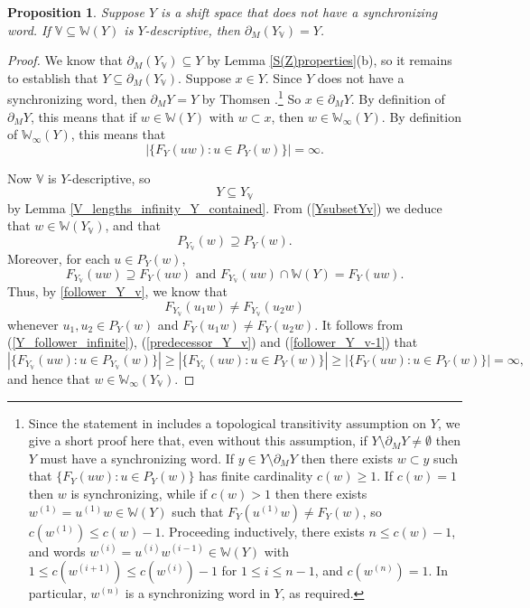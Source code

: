 \documentclass[reqno,11pt]{amsart}
\newtheorem{prop}[thm]{Proposition}
\theoremstyle{definition}
\theoremstyle{remark}
\theoremstyle{remark}
\def\w{\mathbb{W}}
\def\v{\mathbb V}
\numberwithin{equation}{section}
\begin{document}
\begin{prop}\label{partial_Y_v_equals_Y}
Suppose $Y$ is a shift space that  does not have a synchronizing word.
 If $\v\subseteq\w(Y)$
is $Y$-descriptive,
then $\partial_M( Y_\v ) = Y$.
\end{prop}
\begin{proof}
We know that $\partial_M( Y_\v )\subseteq Y$ by Lemma \ref{S(Z)properties}(b), so it remains to establish that
$Y\subseteq \partial_M( Y_\v )$.
Suppose $x\in Y$.
Since $Y$ does not have a synchronizing word, then $\partial_M Y=Y$ by Thomsen 
\cite[Thm.~3.1]{Tho06}.\footnote{Since the statement in \cite[Thm.~3.1]{Tho06} includes a 
topological transitivity assumption on $Y$,
we give a short proof here that, even without this assumption, if $Y\setminus \partial_M Y\neq\emptyset$ then $Y$ must have a synchronizing word. If $y\in Y\setminus \partial_M Y$ then there exists $w\subset y$ such that
$\{F_Y(uw):u\in P_Y(w)\}$ has finite cardinality $c(w)\ge 1$. If $c(w)=1$ then $w$ is synchronizing,
while if $c(w)>1$ then there exists $w^{(1)}=u^{(1)}w\in\w(Y)$ such that $F_Y(u^{(1)}w)\neq F_Y(w)$, so $c(w^{(1)})\le c(w)-1$. Proceeding inductively, there exists $n\le c(w)-1$, and words
$w^{(i)}=u^{(i)}w^{(i-1)}\in\w(Y)$ with $1 \le c(w^{(i+1)})\le c(w^{(i)})-1$ for $1\le i\le n-1$,  and $c(w^{(n)})=1$. 
In particular, $w^{(n)}$ is a
synchronizing word in $Y$, as required.}
So $x\in \partial_M Y$.
By definition of $\partial_M Y$, this means that if $w\in\w(Y)$
with $w\subset x$, then
$w\in\w_\infty(Y)$.
By definition of $\w_\infty(Y)$, this means that
\begin{equation}\label{Y_follower_infinite}
|\{F_Y(uw): u\in P_Y(w)\}|=\infty.
\end{equation}

Now  $\v$
is $Y$-descriptive,
so
\begin{equation}\label{YsubsetYv}
Y \subseteq Y_\v
\end{equation}
by Lemma \ref{V_lengths_infinity_Y_contained}.
From (\ref{YsubsetYv}) we deduce that $w\in\w(Y_\v)$, and that
\begin{equation}\label{predecessor_Y_v}
P_{Y_\v}(w) \supseteq P_Y(w).
\end{equation}
Moreover, for each $u\in P_Y(w)$,
\begin{equation}\label{follower_Y_v}
F_{Y_\v}(uw) \supseteq F_Y(uw)  \text{ and } F_{Y_\v}(uw)\cap \w(Y)=F_Y(uw).
\end{equation}
Thus, by \eqref{follower_Y_v}, we know that 
\begin{equation}\label{follower_Y_v-1}
F_{Y_\v}(u_1w)\neq F_{Y_\v}(u_2w)
\end{equation}
whenever $u_1,u_2\in P_Y(w)$ and $F_Y(u_1w)\neq F_Y(u_2w)$.
It follows from (\ref{Y_follower_infinite}), (\ref{predecessor_Y_v}) and (\ref{follower_Y_v-1}) that
$$
|\{F_{Y_\v}(uw): u\in P_{Y_\v}(w)\}|\ge |\{F_{Y_\v}(uw): u\in P_{Y}(w)\}|\ge |\{F_{Y}(uw): u\in P_{Y}(w)\}|=\infty,
$$
and hence that $w\in \w_\infty(Y_\v)$.


\end{proof}
\end{document}

